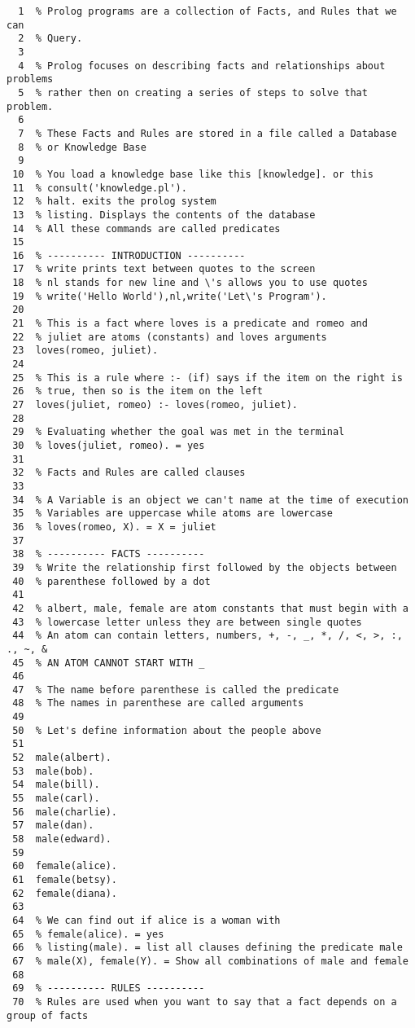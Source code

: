 \documentclass[11pt]{article}
\begin{document}
\begin{verbatim}
  1  % Prolog programs are a collection of Facts, and Rules that we can
  2  % Query.
  3  
  4  % Prolog focuses on describing facts and relationships about problems
  5  % rather then on creating a series of steps to solve that problem.
  6  
  7  % These Facts and Rules are stored in a file called a Database
  8  % or Knowledge Base
  9  
 10  % You load a knowledge base like this [knowledge]. or this
 11  % consult('knowledge.pl').
 12  % halt. exits the prolog system
 13  % listing. Displays the contents of the database
 14  % All these commands are called predicates
 15  
 16  % ---------- INTRODUCTION ----------
 17  % write prints text between quotes to the screen
 18  % nl stands for new line and \'s allows you to use quotes
 19  % write('Hello World'),nl,write('Let\'s Program').
 20  
 21  % This is a fact where loves is a predicate and romeo and
 22  % juliet are atoms (constants) and loves arguments
 23  loves(romeo, juliet).
 24  
 25  % This is a rule where :- (if) says if the item on the right is
 26  % true, then so is the item on the left
 27  loves(juliet, romeo) :- loves(romeo, juliet).
 28  
 29  % Evaluating whether the goal was met in the terminal
 30  % loves(juliet, romeo). = yes
 31  
 32  % Facts and Rules are called clauses
 33  
 34  % A Variable is an object we can't name at the time of execution
 35  % Variables are uppercase while atoms are lowercase
 36  % loves(romeo, X). = X = juliet
 37  
 38  % ---------- FACTS ----------
 39  % Write the relationship first followed by the objects between
 40  % parenthese followed by a dot
 41  
 42  % albert, male, female are atom constants that must begin with a
 43  % lowercase letter unless they are between single quotes
 44  % An atom can contain letters, numbers, +, -, _, *, /, <, >, :, ., ~, &
 45  % AN ATOM CANNOT START WITH _
 46  
 47  % The name before parenthese is called the predicate
 48  % The names in parenthese are called arguments
 49  
 50  % Let's define information about the people above
 51  
 52  male(albert).
 53  male(bob).
 54  male(bill).
 55  male(carl).
 56  male(charlie).
 57  male(dan).
 58  male(edward).
 59  
 60  female(alice).
 61  female(betsy).
 62  female(diana).
 63  
 64  % We can find out if alice is a woman with
 65  % female(alice). = yes
 66  % listing(male). = list all clauses defining the predicate male
 67  % male(X), female(Y). = Show all combinations of male and female
 68  
 69  % ---------- RULES ----------
 70  % Rules are used when you want to say that a fact depends on a group of facts

\end{verbatim}
\end{document}
